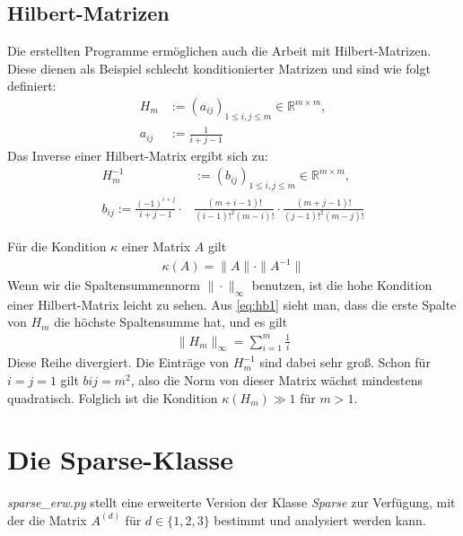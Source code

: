 \documentclass[letterpaper,10pt,ngerman, oneside, openright]{sphinxmanual}
\begin{document}
\section{Hilbert-Matrizen}
Die erstellten Programme ermöglichen auch die Arbeit mit Hilbert-Matrizen. Diese dienen als Beispiel schlecht konditionierter Matrizen und sind wie folgt definiert:
\begin{align}
H_m &:= (a_{ij})_{1\le i, j \le m} \in \mathbb{R}^{m\times m}, 	\\
a_{ij} &:= \frac{1}{i+j-1} \label{eq:hb1}
\end{align}
Das Inverse einer Hilbert-Matrix ergibt sich zu:
\begin{align}
H_m^{-1}& := (b_{ij})_{1\le i, j \le m} \in \mathbb{R}^{m\times m},	\\
b_{ij} := \frac{(-1)^{i+j}}{i+j-1}\cdot &\frac{(m+i-1)!}{(i-1)!^2(m-i)!}\cdot \frac{(m+j-1)!}{(j-1)!^2(m-j)!}
\end{align}

Für die Kondition $\kappa$ einer Matrix $A$ gilt
\begin{align}
\kappa(A)=\|A\|\cdot \|A^{-1}\|
\end{align}
Wenn wir die Spaltensummennorm $\|\cdot \|_{\infty}$ benutzen, ist die hohe Kondition einer Hilbert-Matrix leicht zu sehen. Aus \eqref{eq:hb1}  sieht man, dass die erste Spalte von $H_m$ die höchste Spaltensumme hat, und es gilt
\begin{align}
\|H_m\|_{\infty}=\sum_{i=1}^{m}\frac{1}{i}
\end{align}
Diese Reihe divergiert. Die Einträge von $H_m^{-1}$ sind dabei sehr groß. Schon für $i=j=1$ gilt $bij = m^2$, also die Norm von dieser Matrix wächst mindestens quadratisch. Folglich ist die Kondition $\kappa(H_m)\gg1$ für $m>1$.

\chapter{Die Sparse-Klasse}

\label{\detokenize{index:welcome-to-serie-3-s-documentation}}\label{\detokenize{index:module-sparse_erw}}\label{\detokenize{index:die-sparse-klasse}}
\textit{sparse\_erw.py} stellt eine erweiterte Version der  Klasse \textit{Sparse} zur Verfügung, mit der die Matrix $A^{(d)}$ für $d\in\{1,2,3\}$
bestimmt und analysiert werden kann.
\end{document}
